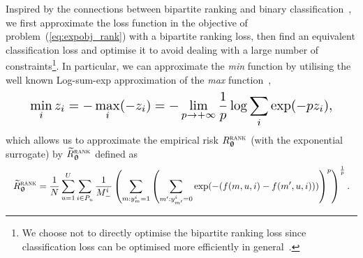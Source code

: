 
Inspired by the connections between bipartite ranking and binary classification~\cite{ertekin2011equivalence,menon2016bipartite},
we first approximate the loss function in the objective of problem~(\ref{eq:expobj_rank}) with
a bipartite ranking loss, then find an equivalent classification loss and optimise it to 
avoid dealing with a large number of 
constraints\footnote{We choose not to directly optimise the bipartite ranking loss 
since classification loss can be optimised more efficiently in general~\cite{ertekin2011equivalence}.}.
%
In particular, 
we can approximate the \emph{min} function by utilising the well known Log-sum-exp approximation 
of the \emph{max} function~\cite[p. 72]{boyd2004convex},
\begin{equation*}
\resizebox{.9\columnwidth}{!}{$
  \displaystyle \min_i z_i 
= \displaystyle -\max_i (-z_i) 
= \displaystyle -\lim_{p \to +\infty} \frac{1}{p} \log \sum_i \exp(-p z_i),
$}
\end{equation*}
%
which allows us to approximate the empirical risk $R_{{\bm{\uptheta}}}^{\textsc{rank}}$ (with the exponential surrogate)
by $\widetilde R_{{\bm{\uptheta}}}^{\textsc{rank}}$ defined as
\begin{equation*}
\resizebox{\linewidth}{!}{$
\begin{aligned}
\widetilde R_{\upthetabm}^{\textsc{rank}}
= \frac{1}{N} \sum_{u=1}^U \sum_{i \in P_u} \frac{1}{M_-^i} \left( \sum_{m: y_m^i = 1} \left( \sum_{m': y_{m'}^i = 0} 
  \exp(-(f(m, u, i) - f(m', u, i))) \right)^p \right)^\frac{1}{p}.
\end{aligned}
$}
\end{equation*}


